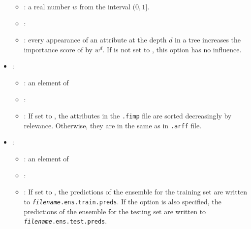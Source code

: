 \begin{itemize}
           \begin{itemize}
                \item \optionPossibleValues{}: a real number $w$ from the interval $(0, 1]$.
                \item \optionDefaultValue{}: 
                \item \optionDescrption{}: every appearance of an attribute at the depth $d$ in a tree increases the importance score of  by $w^d$. If  is not
                set to , this option has no influence.
           \end{itemize}
    \item {}:
           \begin{itemize}
                \item \optionPossibleValues{}: an element of 
                \item \optionDefaultValue{}: 
                \item \optionDescrption{}: If set to , the attributes in the \texttt{.fimp} file are sorted decreasingly by relevance. Otherwise, they are in the same as in \texttt{.arff} file.
           \end{itemize}
    \item {}:
           \begin{itemize}
                \item \optionPossibleValues{}: an element of 
                \item \optionDefaultValue{}: 
                \item \optionDescrption{}: If set to , the predictions of the ensemble for the training set are written to \texttt{{\em filename}.ens.train.preds}.
                If the option  is also specified,  the predictions of the ensemble for the testing set are written to \texttt{{\em filename}.ens.test.preds}.
           \end{itemize}
\end{itemize}
